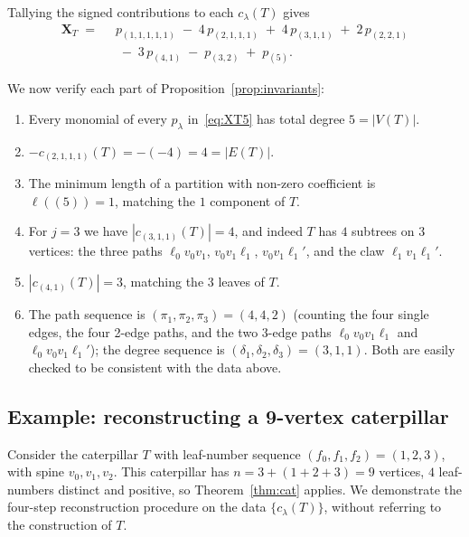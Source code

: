 \documentclass[11pt]{article}
\theoremstyle{definition}
\newcommand{\X}{\mathbf{X}}
\begin{document}
Tallying the signed contributions to each $c_\lambda(T)$ gives
\begin{align}
   \X_T \;=\;\;& p_{(1,1,1,1,1)} \;-\; 4\,p_{(2,1,1,1)} \;+\; 4\,p_{(3,1,1)}
              \;+\; 2\,p_{(2,2,1)} \nonumber\\
              & \;-\; 3\,p_{(4,1)} \;-\; p_{(3,2)} \;+\; p_{(5)}.
   \label{eq:XT5}
\end{align}

We now verify each part of Proposition~\ref{prop:invariants}:
\begin{enumerate}[label=\textup{(\roman*)}]
   \item Every monomial of every $p_\lambda$ in~\eqref{eq:XT5} has
         total degree $5 = |V(T)|$.
   \item $-c_{(2,1,1,1)}(T) = -(-4) = 4 = |E(T)|$.
   \item The minimum length of a partition with non-zero coefficient
         is $\ell((5)) = 1$, matching the $1$ component of $T$.
   \item For $j=3$ we have $|c_{(3,1,1)}(T)| = 4$, and indeed $T$ has
         $4$ subtrees on $3$ vertices: the three paths
         $\ell_0v_0v_1$, $v_0v_1\ell_1$, $v_0v_1\ell_1'$, and the
         claw $\ell_1v_1\ell_1'$.
   \item $|c_{(4,1)}(T)| = 3$, matching the $3$ leaves of $T$.
   \item The path sequence is $(\pi_1,\pi_2,\pi_3) = (4,4,2)$
         (counting the four single edges, the four 2-edge paths, and
         the two 3-edge paths $\ell_0v_0v_1\ell_1$ and
         $\ell_0v_0v_1\ell_1'$); the degree sequence is
         $(\delta_1,\delta_2,\delta_3) = (3,1,1)$.  Both are easily
         checked to be consistent with the data above.
\end{enumerate}

\subsection{Example: reconstructing a 9-vertex caterpillar}\label{ex:2}

Consider the caterpillar $T$ with leaf-number sequence
$(f_0,f_1,f_2) = (1,2,3)$, with spine $v_0,v_1,v_2$.  This
caterpillar has $n = 3 + (1+2+3) = 9$ vertices, $4$ leaf-numbers
distinct and positive, so Theorem~\ref{thm:cat} applies.  We
demonstrate the four-step reconstruction procedure on the data
$\{c_\lambda(T)\}$, without referring to the construction of $T$.
\end{document}
